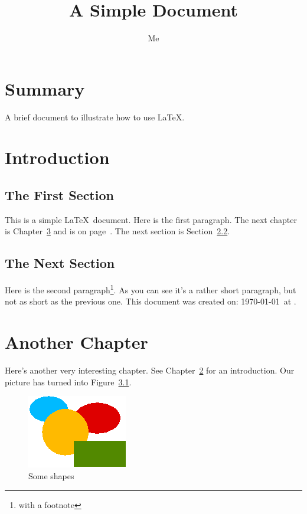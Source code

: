 \documentclass[12pt,captions=tableabove]{scrbook}
\title{A Simple Document}
\author{Me}
\begin{document}
\maketitle

\frontmatter
\tableofcontents
\listoffigures
\listoftables

\chapter{Summary}
A brief document to
illustrate how to use \LaTeX.

\mainmatter
\chapter{Introduction}
\label{ch:intro}

\section{The First Section}

This is a simple \LaTeX\ document.
Here is the first paragraph.
The next chapter is Chapter~\ref{ch:another}
and is on page~\pageref{ch:another}.
The next section is Section~\ref{sec:next}.

\section{The Next Section}
\label{sec:next}

Here is the second paragraph\footnote{with a footnote}. 
As you can see it's a rather short paragraph, but not 
as short as the previous one. This document was 
created on: \today\ at \currenttime.

\chapter{Another Chapter}
\label{ch:another}

Here's another very interesting chapter.
See Chapter~\ref{ch:intro} for an 
introduction. Our picture has turned
into Figure~\ref{fig:shapes}.

\begin{figure}[htbp]
\centering
 \includegraphics{shapes}
\caption{Some shapes}
\label{fig:shapes}
\end{figure}
\end{document}
